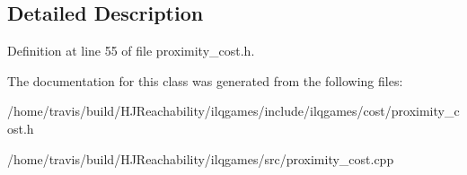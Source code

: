 \subsection{Detailed Description}


Definition at line 55 of file proximity\+\_\+cost.\+h.



The documentation for this class was generated from the following files\+:\begin{DoxyCompactItemize}
\item 
/home/travis/build/\+H\+J\+Reachability/ilqgames/include/ilqgames/cost/proximity\+\_\+cost.\+h\item 
/home/travis/build/\+H\+J\+Reachability/ilqgames/src/proximity\+\_\+cost.\+cpp\end{DoxyCompactItemize}
